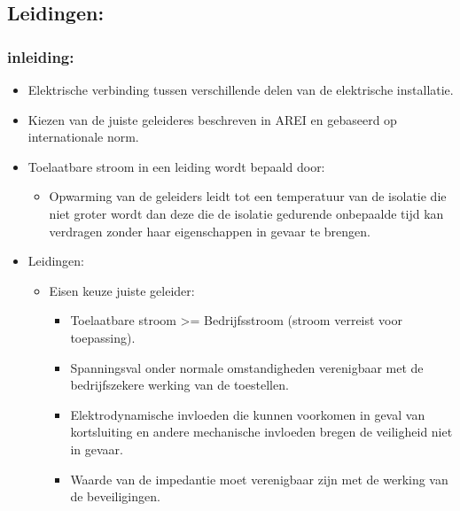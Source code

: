 \documentclass[12pt]{article}
\begin{document}
\subsection{Leidingen:}
\subsubsection{inleiding:}
\begin{itemize}
    \item Elektrische verbinding tussen verschillende delen van de elektrische installatie.
    \item Kiezen van de juiste geleideres beschreven in AREI en gebaseerd op internationale norm. 
    \item Toelaatbare stroom in een leiding wordt bepaald door:\begin{itemize}
        \item Opwarming van de geleiders leidt tot een temperatuur van de isolatie die niet groter wordt dan deze die de isolatie gedurende onbepaalde tijd kan verdragen zonder haar eigenschappen in gevaar te brengen.
    \end{itemize}
\end{itemize}
\begin{itemize}
    \item Leidingen:\begin{itemize}
        \item Eisen keuze juiste geleider:\begin{itemize}
            \item Toelaatbare stroom >= Bedrijfsstroom (stroom verreist voor toepassing).
            \item Spanningsval onder normale omstandigheden verenigbaar met de bedrijfszekere werking van de toestellen.
            \item Elektrodynamische invloeden die kunnen voorkomen in geval van kortsluiting en andere mechanische invloeden bregen de veiligheid niet in gevaar.
            \item Waarde van de impedantie moet verenigbaar zijn met de werking van de beveiligingen.
        \end{itemize}
    \end{itemize}
\end{itemize}
\end{document}
